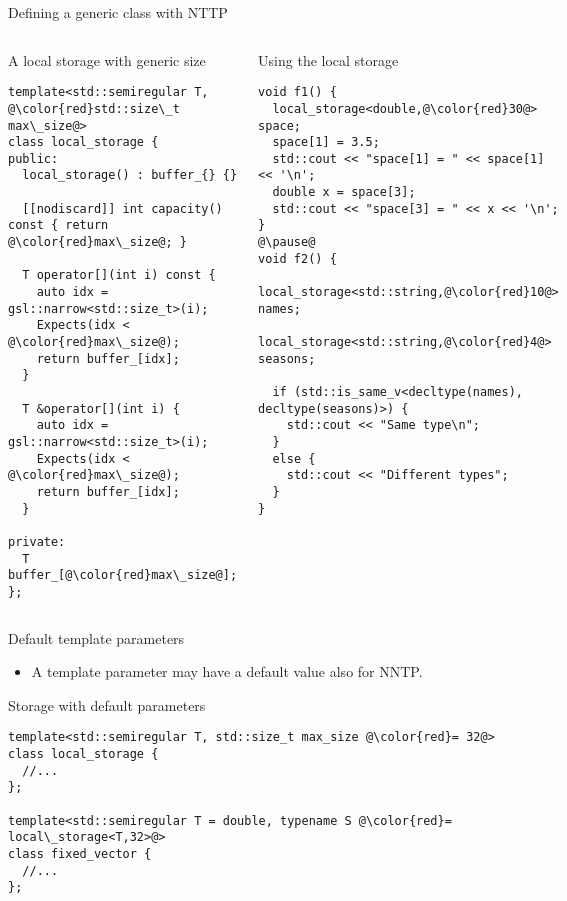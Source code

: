 \begin{frame}[t,fragile,shrink=30]{Defining a generic class with NTTP}

\begin{columns}[T]

\begin{block}{A local storage with generic size}
\begin{lstlisting}[escapechar=@]
template<std::semiregular T, @\color{red}std::size\_t max\_size@>
class local_storage {
public:
  local_storage() : buffer_{} {}

  [[nodiscard]] int capacity() const { return @\color{red}max\_size@; }

  T operator[](int i) const {
    auto idx = gsl::narrow<std::size_t>(i);
    Expects(idx < @\color{red}max\_size@);
    return buffer_[idx];
  }

  T &operator[](int i) {
    auto idx = gsl::narrow<std::size_t>(i);
    Expects(idx < @\color{red}max\_size@);
    return buffer_[idx];
  }

private:
  T buffer_[@\color{red}max\_size@];
};

\end{lstlisting}
\end{block}

\pause
{}
\begin{block}{Using the local storage}
\begin{lstlisting}[escapechar=@]
void f1() {
  local_storage<double,@\color{red}30@> space;
  space[1] = 3.5;
  std::cout << "space[1] = " << space[1] << '\n';
  double x = space[3];
  std::cout << "space[3] = " << x << '\n';
}
@\pause@
void f2() {
  local_storage<std::string,@\color{red}10@> names;
  local_storage<std::string,@\color{red}4@> seasons;

  if (std::is_same_v<decltype(names), decltype(seasons)>) {
    std::cout << "Same type\n";
  }
  else {
    std::cout << "Different types";
  }
}
\end{lstlisting}
\end{block}

\end{columns}
\end{frame}

\begin{frame}[t,fragile]{Default template parameters}
\begin{itemize}
  \item A template parameter may have a default value also for NNTP.
\end{itemize}

\begin{block}{Storage with default parameters}
\begin{lstlisting}[escapechar=@]
template<std::semiregular T, std::size_t max_size @\color{red}= 32@>
class local_storage {
  //...
};

template<std::semiregular T = double, typename S @\color{red}= local\_storage<T,32>@>
class fixed_vector {
  //...
};
\end{lstlisting}
\end{block}
\end{frame}

